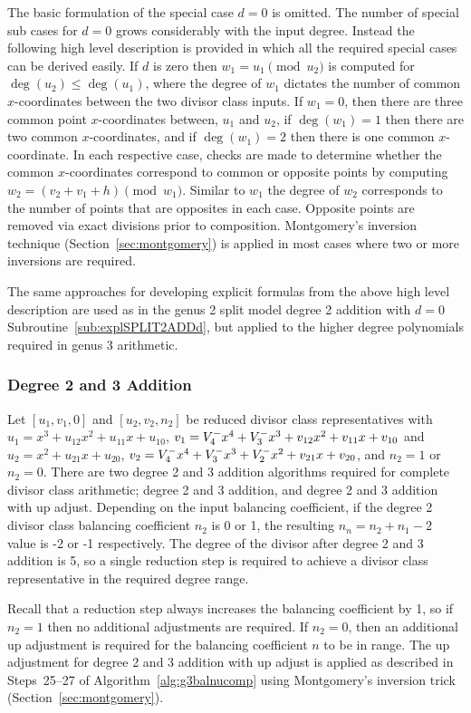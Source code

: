 The basic formulation of the special case $d = 0$ is omitted. The number of
special sub cases for $d=0$ grows considerably with the input degree. Instead
the following high level description is provided in which all the required
special cases can be derived easily. If $d$ is zero then $w_1 = u_1 \pmod {u_2}$
is computed for $\deg(u_2) \leq \deg(u_1)$, where the degree of $w_1$ dictates
the number of common $x$-coordinates between the two divisor class inputs. If
$w_1=0$, then there are three common point $x$-coordinates between, $u_1$ and
$u_2$, if $\deg(w_1) = 1$ then there are two common $x$-coordinates, and if
$\deg(w_1) = 2$ then there is one common $x$-coordinate. In each respective
case, checks are made to determine whether the common $x$-coordinates correspond
to common or opposite points by computing $w_2 = (v_2 + v_1 + h) \pmod{w_1}$.
Similar to $w_1$ the degree of $w_2$ corresponds to the number of points that
are opposites in each case. Opposite points are removed via exact divisions
prior to composition. Montgomery's inversion technique
(Section~\ref{sec:montgomery}) is applied in most cases where two or more
inversions are required. 

The same approaches for developing explicit formulas from the above high level
description are used as in the genus 2 split model degree 2 addition with $d=0$
Subroutine~\ref{sub:explSPLIT2ADDd}, but applied to the higher degree
polynomials required in genus 3 arithmetic.


\subsubsection{Degree 2 and 3 Addition}
Let $[u_1,v_1,0]$ and $[u_2,v_2,n_2]$ be reduced divisor class representatives
with $u_1 = x^3 + u_{12}x^2 + u_{11}x + u_{10}$, $v_1 = V^{-}_4x^4 + V^{-}_3x^3
+ v_{12}x^2 + v_{11}x + v_{10}$ and $u_2 = x^2 + u_{21}x + u_{20}$, $v_2 =
V^{-}_4x^4 + V^{-}_3x^3 + V^{-}_2x^2 + v_{21}x + v_{20}$, and $n_2 = 1$ or $n_2 = 0$.
There are two degree 2 and 3 addition algorithms required for complete divisor
class arithmetic; degree 2 and 3 addition, and degree 2 and 3 addition with up
adjust. Depending on the input balancing coefficient, if the degree 2 divisor
class balancing coefficient $n_2$ is 0 or 1, the resulting $n_n = n_2 + n_1 - 2$
value is -2 or -1 respectively. The degree of the divisor after degree 2 and 3
addition is 5, so a single reduction step is required to achieve a divisor class
representative in the required degree range. 

Recall that a reduction step always increases the balancing coefficient by 1, so
if $n_2 = 1$ then no additional adjustments are required. If $n_2=0$, then an
additional up adjustment is required for the balancing coefficient $n$ to be in
range. The up adjustment for degree 2 and 3 addition with up adjust is applied
as described in Steps~25--27 of Algorithm~\ref{alg:g3balnucomp} using
Montgomery's inversion trick (Section~\ref{sec:montgomery}). 


